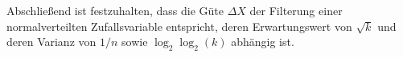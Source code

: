\begin{figure}[H]
\begin{minipage}[t]{.30\textwidth}
    \end{minipage}  
    \hspace*{.8cm}
    \begin{minipage}[t]{.30\textwidth}
        \centering
    \end{minipage}
    \label{fig: min_fit_V_k}
\end{figure}

\noindent
Abschließend ist festzuhalten, dass die Güte $\Delta X$ der Filterung einer normalverteilten Zufallsvariable entspricht, deren Erwartungswert von $\sqrt{k}$ und deren Varianz von $1/n$ sowie $\log_2\log_2(k)$ abhängig ist.




